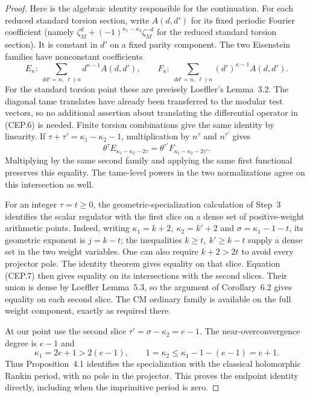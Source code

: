 \begin{proof}
Here is the algebraic identity responsible for the
continuation.  For each reduced standard torsion section,
write $A(d,d')$ for its fixed periodic Fourier coefficient
(namely $\zeta_M^d+(-1)^{\kappa_1-\kappa_2}\zeta_M^{-d}$
for the reduced standard torsion section).
It is constant in $d'$ on a fixed parity component.
The two
Eisenstein families have nonconstant coefficients
\[
 E_\kappa:\ \sum_{dd'=n,\ \ell\nmid n}
                  d^{\kappa-1}A(d,d'),\qquad
 F_\kappa:\ \sum_{dd'=n,\ \ell\nmid n}
                  (d')^{\kappa-1}A(d,d').
                                                        \tag{CEP.6}
\]
For the standard torsion point these are precisely
Loeffler's Lemma~3.2.  The diagonal tame translates
have already been transferred to the modular test
vectors, so no additional assertion about translating
the differential operator in (CEP.6) is needed.
Finite torsion combinations give the same identity
by linearity.
If
$\tau+\tau'=\kappa_1-\kappa_2-1$, multiplication by
$n^\tau$ and $n^{\tau'}$ gives
\[
 \theta^\tau E_{\kappa_1-\kappa_2-2\tau}
       =\theta^{\tau'}F_{\kappa_1-\kappa_2-2\tau'}.
                                                        \tag{CEP.7}
\]
Multiplying by the same second family and applying the
same first functional preserves this equality.
The tame-level powers in the two normalizations agree
on this intersection as well.

For an integer $\tau=t\ge0$, the geometric-specialization
calculation of Step~3 identifies the scalar regulator
with the first slice on a dense set of positive-weight
arithmetic points.  Indeed, writing
$\kappa_1=k+2,\ \kappa_2=k'+2$ and
$\sigma=\kappa_1-1-t$, its geometric exponent is
$j=k-t$; the inequalities
$k\ge t,\ k'\ge k-t$ supply a dense set in the two
weight variables.  One can also require $k+2>2t$
to avoid every projector pole.  The identity theorem
gives equality on that slice.
Equation (CEP.7) then gives equality on its
intersections with the second slices.  Their union is
dense by Loeffler Lemma~5.3, so the argument of
Corollary~6.2 gives equality on each second slice.
The CM ordinary family is available on the full
weight component, exactly as required there.

At our point use the second slice
$\tau'=\sigma-\kappa_2=e-1$.
The near-overconvergence degree is $e-1$ and
\[
 \kappa_1=2e+1>2(e-1),\qquad
 1=\kappa_2\le\kappa_1-1-(e-1)=e+1.
                                                        \tag{CEP.8}
\]
Thus Proposition~4.1 identifies the specialization
with the classical holomorphic Rankin period, with
no pole in the projector.  This proves the endpoint
identity directly, including when the imprimitive
period is zero.


\end{proof}
